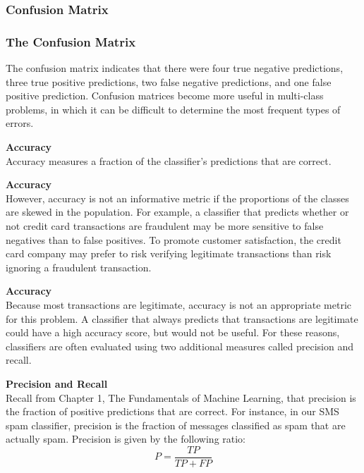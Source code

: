 \documentclass[PredictiveAnalytics101.tex]{subfiles}
\begin{document}
 

\begin{frame}
\frametitle{Confusion Matrix}

\end{frame}

\begin{frame}
\frametitle{The Confusion Matrix}
The confusion matrix indicates that there were four true negative predictions, three
true positive predictions, two false negative predictions, and one false positive
prediction. Confusion matrices become more useful in multi-class problems, in
which it can be difficult to determine the most frequent types of errors.
\end{frame}
\begin{frame}
\textbf{Accuracy}\\
Accuracy measures a fraction of the classifier's predictions that are correct.
\end{frame}
\begin{frame}
	\textbf{Accuracy}\\
However, accuracy is not an informative metric if the proportions of
the classes are skewed in the population. For example, a classifier that predicts
whether or not credit card transactions are fraudulent may be more sensitive to
false negatives than to false positives. To promote customer satisfaction, the credit
card company may prefer to risk verifying legitimate transactions than risk ignoring
a fraudulent transaction. 
\end{frame}
\begin{frame}
\textbf{Accuracy}\\
Because most transactions are legitimate, accuracy is
not an appropriate metric for this problem. A classifier that always predicts that
transactions are legitimate could have a high accuracy score, but would not be
useful. For these reasons, classifiers are often evaluated using two additional
measures called precision and recall.
\end{frame}
\begin{frame}
\textbf{Precision and Recall}\\
Recall from Chapter 1, The Fundamentals of Machine Learning, that precision is the
fraction of positive predictions that are correct. For instance, in our SMS spam
classifier, precision is the fraction of messages classified as spam that are actually
spam. Precision is given by the following ratio:
\[ P = \frac{TP}{TP + FP} \]
\end{frame}
\end{document}
